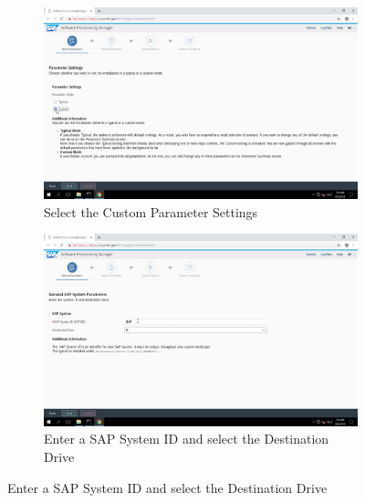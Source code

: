 \begin{figure}[!htb]\ContinuedFloat
    \begin{subfigure}{0.5\textwidth}
        \captionsetup{width=0.8\linewidth}
        \includegraphics[width=0.9\linewidth]{img/Methodologie/SAP34.png}
        \centering
        \caption{Select the Custom Parameter Settings}
    \end{subfigure}
    \begin{subfigure}{0.5\textwidth}
        \captionsetup{width=0.8\linewidth}
        \includegraphics[width=0.9\linewidth]{img/Methodologie/SAP33.png} 
        \centering
        \caption{Enter a SAP System ID and select the Destination Drive}
    \end{subfigure}
\end{figure}
